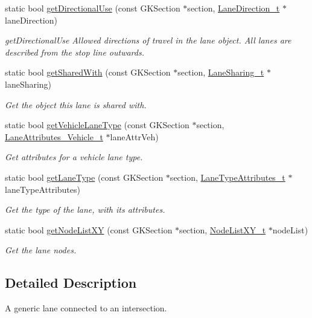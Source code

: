 \begin{DoxyCompactItemize}
static bool \hyperlink{classV2XGenericLane_a171b13ef927f7de010def22904942f92}{get\+Directional\+Use} (const G\+K\+Section $\ast$section, \hyperlink{structBIT__STRING__s}{Lane\+Direction\+\_\+t} $\ast$lane\+Direction)
\begin{DoxyCompactList}\small\item\em get\+Directional\+Use Allowed directions of travel in the lane object. All lanes are described from the stop line outwards. \end{DoxyCompactList}\item 
static bool \hyperlink{classV2XGenericLane_aa233aac13f8d6ab512cf32b2785b4cf0}{get\+Shared\+With} (const G\+K\+Section $\ast$section, \hyperlink{structBIT__STRING__s}{Lane\+Sharing\+\_\+t} $\ast$lane\+Sharing)
\begin{DoxyCompactList}\small\item\em Get the object this lane is shared with. \end{DoxyCompactList}\item 
static bool \hyperlink{classV2XGenericLane_a5862f995774786d081e019dc48469e43}{get\+Vehicle\+Lane\+Type} (const G\+K\+Section $\ast$section, \hyperlink{structBIT__STRING__s}{Lane\+Attributes\+\_\+\+Vehicle\+\_\+t} $\ast$lane\+Attr\+Veh)
\begin{DoxyCompactList}\small\item\em Get attributes for a vehicle lane type. \end{DoxyCompactList}\item 
static bool \hyperlink{classV2XGenericLane_ac28ac1659e153745d5f3d4c348deab20}{get\+Lane\+Type} (const G\+K\+Section $\ast$section, \hyperlink{structLaneTypeAttributes}{Lane\+Type\+Attributes\+\_\+t} $\ast$lane\+Type\+Attributes)
\begin{DoxyCompactList}\small\item\em Get the type of the lane, with its attributes. \end{DoxyCompactList}\item 
static bool \hyperlink{classV2XGenericLane_a923658a7f6c809ed4fddbb4406deff31}{get\+Node\+List\+XY} (const G\+K\+Section $\ast$section, \hyperlink{structNodeListXY}{Node\+List\+X\+Y\+\_\+t} $\ast$node\+List)
\begin{DoxyCompactList}\small\item\em Get the lane nodes. \end{DoxyCompactList}\end{DoxyCompactItemize}


\subsection{Detailed Description}
A generic lane connected to an intersection. 

